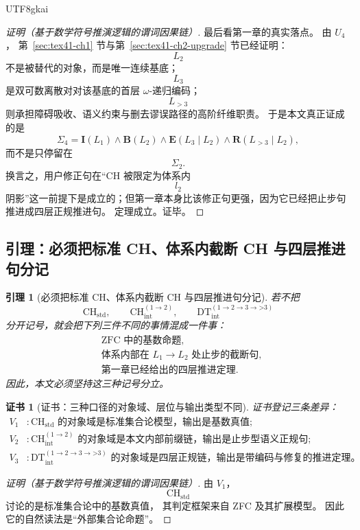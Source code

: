 \documentclass[12pt]{article}
\newtheorem{lemma}{引理}[section]
\newtheorem{Certificate}{证书}[section]
\newcommand{\CHstd}{\mathrm{CH}_{\mathrm{std}}}
\newcommand{\CHint}{\mathrm{CH}_{\mathrm{int}}}
\newcommand{\DTint}{\mathrm{DT}_{\mathrm{int}}}
\begin{document}
\begin{CJK*}{UTF8}{gkai}
\begin{proof}[证明（基于数学符号推演逻辑的谓词因果链）]
最后看第一章的真实落点。
由 $U_4$，
第~\ref{sec:tex41-ch1} 节与第~\ref{sec:tex41-ch2-upgrade} 节已经证明：
\[
  L_2
\]
不是被替代的对象，而是唯一连续基底；
\[
  L_3
\]
是双可数离散对对该基底的首层 $\omega$-递归编码；
\[
  L_{>3}
\]
则承担障碍吸收、语义约束与删去谬误路径的高阶纤维职责。
于是本文真正证成的是
\[
  \Sigma_4
  =
  \mathbf I(L_1)\wedge
  \mathbf B(L_2)\wedge
  \mathbf E(L_3\mid L_2)\wedge
  \mathbf R(L_{>3}\mid L_2),
\]
而不是只停留在
\[
  \Sigma_2.
\]
换言之，用户修正句在“CH 被限定为体系内
\[
  l_2
\]
阴影”这一前提下是成立的；但第一章本身比该修正句更强，因为它已经把止步句推进成四层正规推进句。
定理成立。证毕。
\end{proof}

\subsection{引理：必须把标准 CH、体系内截断 CH 与四层推进句分记}
\label{subsec:tex41-ch-confirmation-lemma}

\begin{lemma}[必须把标准 CH、体系内截断 CH 与四层推进句分记]
\label{lem:tex41-ch-confirmation-notation}
若不把
\[
  \CHstd,\qquad
  \CHint^{(1\to2)},\qquad
  \DTint^{(1\to2\to3\to\text{>3})}
\]
分开记号，就会把下列三件不同的事情混成一件事：
\[
  \begin{aligned}
    &\text{ZFC 中的基数命题},\\
    &\text{体系内部在 }L_1\to L_2\text{ 处止步的截断句},\\
    &\text{第一章已经给出的四层推进定理}.
  \end{aligned}
\]
因此，本文必须坚持这三种记号分立。
\end{lemma}

\begin{Certificate}[证书：三种口径的对象域、层位与输出类型不同]
\label{cert:tex41-ch-confirmation-notation}
证书登记三条差异：
\[
\begin{aligned}
  V_1 &: \CHstd\text{ 的对象域是标准集合论模型，输出是基数真值};\\
  V_2 &: \CHint^{(1\to2)}\text{ 的对象域是本文内部前缀链，输出是止步型语义正规句};\\
  V_3 &: \DTint^{(1\to2\to3\to\text{>3})}\text{ 的对象域是四层正规链，输出是带编码与修复的推进定理。}
\end{aligned}
\]
\end{Certificate}

\begin{proof}[证明（基于数学符号推演逻辑的谓词因果链）]
由 $V_1$，
\[
  \CHstd
\]
讨论的是标准集合论中的基数真值，
其判定框架来自 ZFC 及其扩展模型。
因此它的自然读法是“外部集合论命题”。


\end{proof}
\end{CJK*}
\end{document}
